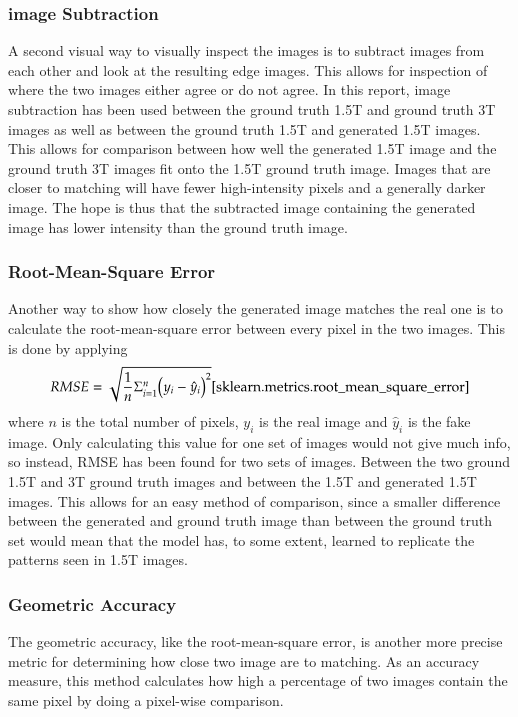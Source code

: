 \documentclass[12pt, fleqn, titlepage]{article}
\newcommand{\1}[1]{\mathds{1}\left[#1\right]}
\begin{document}
\subsubsection{image Subtraction}\label{image_subtraction}
A second visual way to visually inspect the images is to subtract images from each other and look at the resulting edge images. This allows for inspection of where the two images either agree or do not agree. In this report, image subtraction has been used between the ground truth 1.5T and ground truth 3T images as well as between the ground truth 1.5T and generated 1.5T images. This allows for comparison between how well the generated 1.5T image and the ground truth 3T images fit onto the 1.5T ground truth image. Images that are closer to matching will have fewer high-intensity pixels and a generally darker image. The hope is thus that the subtracted image containing the generated image has lower intensity than the ground truth image.

\subsubsection{Root-Mean-Square Error}\label{rmse}
Another way to show how closely the generated image matches the real one is to calculate the root-mean-square error between every pixel in the two images. This is done by applying
\begin{equation}
	RMSE = \sqrt{\frac{1}{n}\Sigma_{i=1}^{n}{\Big(y_i - \hat{y}_i\Big)^2}}\cite{sklearn.metrics.root_mean_square_error}
\end{equation}
where $n$ is the total number of pixels, $y_i$ is the real image and $\hat{y}_i$ is the fake image. Only calculating this value for one set of images would not give much info, so instead, RMSE has been found for two sets of images. Between the two ground 1.5T and 3T ground truth images and between the 1.5T and generated 1.5T images. This allows for an easy method of comparison, since a smaller difference between the generated and ground truth image than between the ground truth set would mean that the model has, to some extent, learned to replicate the patterns seen in 1.5T images.

\subsubsection{Geometric Accuracy}\label{geometric_accuracy}
The geometric accuracy, like the root-mean-square error, is another more precise metric for determining how close two image are to matching. As an accuracy measure, this method calculates how high a percentage of two images contain the same pixel by doing a pixel-wise comparison.
\end{document}
